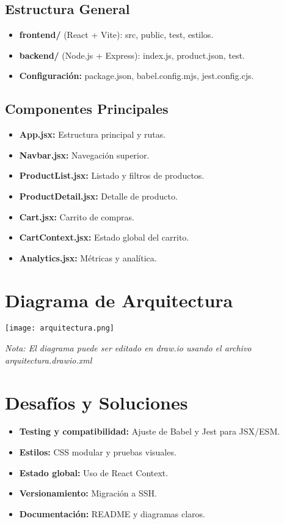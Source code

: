 \documentclass[12pt]{article}
\begin{document}
\subsection*{Estructura General}
\begin{itemize}
  \item \textbf{frontend/} (React + Vite): src, public, test, estilos.
  \item \textbf{backend/} (Node.js + Express): index.js, product.json, test.
  \item \textbf{Configuración:} package.json, babel.config.mjs, jest.config.cjs.
\end{itemize}

\subsection*{Componentes Principales}
\begin{itemize}
  \item \textbf{App.jsx:} Estructura principal y rutas.
  \item \textbf{Navbar.jsx:} Navegación superior.
  \item \textbf{ProductList.jsx:} Listado y filtros de productos.
  \item \textbf{ProductDetail.jsx:} Detalle de producto.
  \item \textbf{Cart.jsx:} Carrito de compras.
  \item \textbf{CartContext.jsx:} Estado global del carrito.
  \item \textbf{Analytics.jsx:} Métricas y analítica.
\end{itemize}

\section{Diagrama de Arquitectura}
\begin{center}
\texttt{[image: arquitectura.png]}
\end{center}
\textit{Nota: El diagrama puede ser editado en draw.io usando el archivo arquitectura.drawio.xml}

\section{Desafíos y Soluciones}
\begin{itemize}
  \item \textbf{Testing y compatibilidad:} Ajuste de Babel y Jest para JSX/ESM.
  \item \textbf{Estilos:} CSS modular y pruebas visuales.
  \item \textbf{Estado global:} Uso de React Context.
  \item \textbf{Versionamiento:} Migración a SSH.
  \item \textbf{Documentación:} README y diagramas claros.
\end{itemize}
\end{document}
